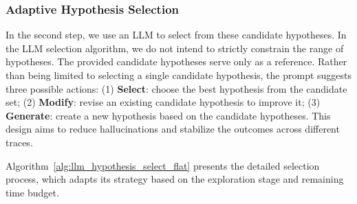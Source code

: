 \subsubsection{Adaptive Hypothesis Selection}

In the second step, we use an LLM to select from these candidate hypotheses. In the LLM selection algorithm, we do not intend to strictly constrain the range of hypotheses. The provided candidate hypotheses serve only as a reference. Rather than being limited to selecting a single candidate hypothesis, the prompt suggests three possible actions: (1) \textbf{Select}: choose the best hypothesis from the candidate set; (2) \textbf{Modify}: revise an existing candidate hypothesis to improve it; (3) \textbf{Generate}: create a new hypothesis based on the candidate hypotheses. This design aims to reduce hallucinations and stabilize the outcomes across different traces.

Algorithm~\ref{alg:llm_hypothesis_select_flat} presents the detailed selection process, which adapts its strategy based on the exploration stage and remaining time budget.



